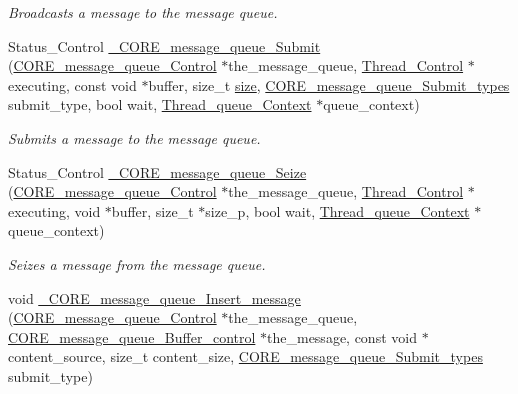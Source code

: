 \begin{DoxyCompactItemize}
\begin{DoxyCompactList}\small\item\em Broadcasts a message to the message queue. \end{DoxyCompactList}\item 
Status\+\_\+\+Control \mbox{\hyperlink{group__RTEMSScoreMessageQueue_ga36a76a49f99537867181014cd88af33a}{\+\_\+\+C\+O\+R\+E\+\_\+message\+\_\+queue\+\_\+\+Submit}} (\mbox{\hyperlink{structCORE__message__queue__Control}{C\+O\+R\+E\+\_\+message\+\_\+queue\+\_\+\+Control}} $\ast$the\+\_\+message\+\_\+queue, \mbox{\hyperlink{struct__Thread__Control}{Thread\+\_\+\+Control}} $\ast$executing, const void $\ast$buffer, size\+\_\+t \mbox{\hyperlink{sun4u_2tte_8h_a245260f6f74972558f61b85227df5aae}{size}}, \mbox{\hyperlink{group__RTEMSScoreMessageQueue_ga0859edb437502e53fd2c7a73bce6b33c}{C\+O\+R\+E\+\_\+message\+\_\+queue\+\_\+\+Submit\+\_\+types}} submit\+\_\+type, bool wait, \mbox{\hyperlink{structThread__queue__Context}{Thread\+\_\+queue\+\_\+\+Context}} $\ast$queue\+\_\+context)
\begin{DoxyCompactList}\small\item\em Submits a message to the message queue. \end{DoxyCompactList}\item 
Status\+\_\+\+Control \mbox{\hyperlink{group__RTEMSScoreMessageQueue_ga7a7153b494ffd575d84276072f37dfd3}{\+\_\+\+C\+O\+R\+E\+\_\+message\+\_\+queue\+\_\+\+Seize}} (\mbox{\hyperlink{structCORE__message__queue__Control}{C\+O\+R\+E\+\_\+message\+\_\+queue\+\_\+\+Control}} $\ast$the\+\_\+message\+\_\+queue, \mbox{\hyperlink{struct__Thread__Control}{Thread\+\_\+\+Control}} $\ast$executing, void $\ast$buffer, size\+\_\+t $\ast$size\+\_\+p, bool wait, \mbox{\hyperlink{structThread__queue__Context}{Thread\+\_\+queue\+\_\+\+Context}} $\ast$queue\+\_\+context)
\begin{DoxyCompactList}\small\item\em Seizes a message from the message queue. \end{DoxyCompactList}\item 
void \mbox{\hyperlink{group__RTEMSScoreMessageQueue_ga04e5a29d51194c8151bdaf94d2694a63}{\+\_\+\+C\+O\+R\+E\+\_\+message\+\_\+queue\+\_\+\+Insert\+\_\+message}} (\mbox{\hyperlink{structCORE__message__queue__Control}{C\+O\+R\+E\+\_\+message\+\_\+queue\+\_\+\+Control}} $\ast$the\+\_\+message\+\_\+queue, \mbox{\hyperlink{structCORE__message__queue__Buffer__control}{C\+O\+R\+E\+\_\+message\+\_\+queue\+\_\+\+Buffer\+\_\+control}} $\ast$the\+\_\+message, const void $\ast$content\+\_\+source, size\+\_\+t content\+\_\+size, \mbox{\hyperlink{group__RTEMSScoreMessageQueue_ga0859edb437502e53fd2c7a73bce6b33c}{C\+O\+R\+E\+\_\+message\+\_\+queue\+\_\+\+Submit\+\_\+types}} submit\+\_\+type)

\end{DoxyCompactItemize}
